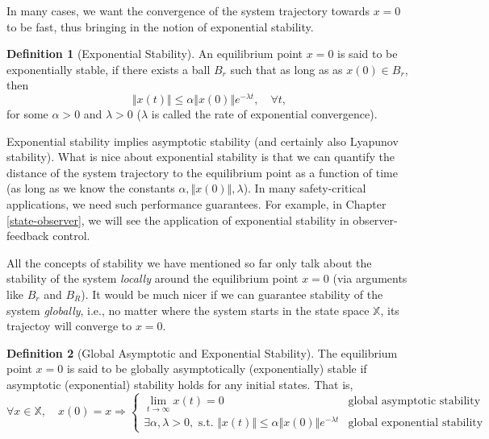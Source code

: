 \documentclass[
]{book}
\theoremstyle{definition}
\newtheorem{definition}{Definition}[chapter]
\theoremstyle{definition}
\theoremstyle{definition}
\theoremstyle{definition}
\theoremstyle{remark}
\begin{document}
In many cases, we want the convergence of the system trajectory towards \(x=0\) to be fast, thus bringing in the notion of exponential stability.

\begin{definition}[Exponential Stability]
\protect\hypertarget{def:exponentialstability}{}\label{def:exponentialstability}An equilibrium point \(x=0\) is said to be exponentially stable, if there exists a ball \(B_r\) such that as long as as \(x(0) \in B_r\), then
\[
\Vert x(t) \Vert \leq \alpha \Vert x(0) \Vert e^{-\lambda t}, \quad \forall t,
\]
for some \(\alpha > 0\) and \(\lambda > 0\) (\(\lambda\) is called the rate of exponential convergence).
\end{definition}

Exponential stability implies asymptotic stability (and certainly also Lyapunov stability). What is nice about exponential stability is that we can quantify the distance of the system trajectory to the equilibrium point as a function of time (as long as we know the constants \(\alpha, \Vert x(0) \Vert, \lambda\)). In many safety-critical applications, we need such performance guarantees. For example, in Chapter \ref{state-observer}, we will see the application of exponential stability in observer-feedback control.

All the concepts of stability we have mentioned so far only talk about the stability of the system \emph{locally} around the equilibrium point \(x=0\) (via arguments like \(B_r\) and \(B_R\)). It would be much nicer if we can guarantee stability of the system \emph{globally}, i.e., no matter where the system starts in the state space \(\mathbb{X}\), its trajectoy will converge to \(x=0\).

\begin{definition}[Global Asymptotic and Exponential Stability]
\protect\hypertarget{def:globalstability}{}\label{def:globalstability}The equilibrium point \(x = 0\) is said to be globally asymptotically (exponentially) stable if asymptotic (exponential) stability holds for any initial states. That is,
\[
\forall x \in \mathbb{X}, \quad x(0) = x \Longrightarrow \begin{cases}
\lim_{t \rightarrow \infty} x(t) = 0  & \text{global asymptotic stability} \\
\exists \alpha, \lambda > 0, \text{ s.t. } \Vert x(t) \Vert \leq \alpha \Vert x(0) \Vert e^{-\lambda t} & \text{global exponential stability}
\end{cases}
\]
\end{definition}
\end{document}
